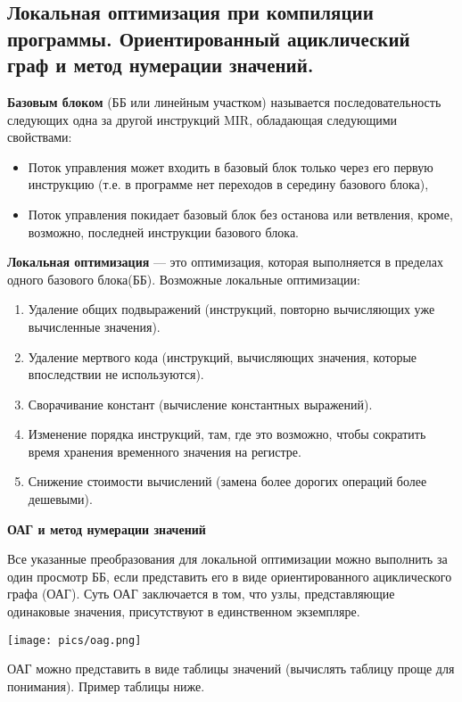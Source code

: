 \subsection{Локальная  оптимизация при  компиляции  программы. Ориентированный  ациклический  граф  и  метод нумерации значений.}

\textbf{Базовым блоком} (ББ или линейным участком) называется последовательность следующих одна за другой инструкций MIR, обладающая следующими свойствами:
\begin{itemize}
    \item Поток управления может входить в базовый блок только через его первую инструкцию (т.е. в программе нет переходов в середину базового блока),
    \item Поток управления покидает базовый блок без останова или ветвления, кроме, возможно, последней инструкции базового блока.
\end{itemize}

\textbf{Локальная оптимизация} --- это оптимизация, которая выполняется в пределах одного базового блока(ББ). Возможные локальные оптимизации:
\begin{enumerate}
    \item Удаление общих подвыражений (инструкций, повторно вычисляющих уже вычисленные значения).
    \item Удаление мертвого кода (инструкций, вычисляющих значения, которые впоследствии не используются).
    \item Сворачивание констант (вычисление константных выражений).
    \item Изменение порядка инструкций, там, где это возможно, чтобы сократить время хранения временного значения на регистре.
    \item Снижение стоимости вычислений (замена более дорогих операций более дешевыми).
\end{enumerate}

\textbf{ОАГ и метод нумерации значений}

Все указанные преобразования для локальной оптимизации можно выполнить за один просмотр ББ, если представить его в виде ориентированного ациклического графа (ОАГ). 
Суть ОАГ заключается в том, что узлы, представляющие одинаковые значения, присутствуют в единственном экземпляре.

\texttt{[image: pics/oag.png]}

ОАГ можно представить в виде таблицы значений (вычислять таблицу проще для понимания). Пример таблицы ниже.


